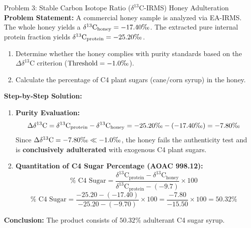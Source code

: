 \documentclass[11pt,a4paper,oneside]{article}
\newcommand{\permil}{\text{\textperthousand}}
\begin{document}
\begin{examplebox}{Problem 3: Stable Carbon Isotope Ratio (\texorpdfstring{$\delta^{13}\mathrm{C}$-IRMS}{delta-13C-IRMS}) Honey Adulteration}
\textbf{Problem Statement:}
A commercial honey sample is analyzed via EA-IRMS. The whole honey yields a $\delta^{13}\text{C}_{\text{honey}} = -17.40\permil$. The extracted pure internal protein fraction yields $\delta^{13}\text{C}_{\text{protein}} = -25.20\permil$.
\begin{enumerate}[label=(\alph*)]
    \item Determine whether the honey complies with purity standards based on the $\Delta \delta^{13}\text{C}$ criterion ($\text{Threshold} = -1.0\permil$).
    \item Calculate the percentage of C4 plant sugars (cane/corn syrup) in the honey.
\end{enumerate}
\vspace{0.2cm}
\textbf{Step-by-Step Solution:}
\begin{enumerate}[label=(\alph*)]
    \item \textbf{Purity Evaluation:}
    $$\Delta \delta^{13}\text{C} = \delta^{13}\text{C}_{\text{protein}} - \delta^{13}\text{C}_{\text{honey}} = -25.20\permil - (-17.40\permil) = -7.80\permil$$
    Since $\Delta \delta^{13}\text{C} = -7.80\permil \ll -1.0\permil$, the honey fails the authenticity test and is \textbf{conclusively adulterated} with exogenous C4 plant sugars.
    
    \item \textbf{Quantitation of C4 Sugar Percentage (AOAC 998.12):}
    $$\% \text{ C4 Sugar} = \frac{\delta^{13}\text{C}_{\text{protein}} - \delta^{13}\text{C}_{\text{honey}}}{\delta^{13}\text{C}_{\text{protein}} - (-9.7)} \times 100$$
    $$\% \text{ C4 Sugar} = \frac{-25.20 - (-17.40)}{-25.20 - (-9.70)} \times 100 = \frac{-7.80}{-15.50} \times 100 = \mathbf{50.32\%}$$
\end{enumerate}
\textbf{Conclusion:} The product consists of $\mathbf{50.32\%}$ adulterant C4 sugar syrup.
\end{examplebox}
\end{document}
